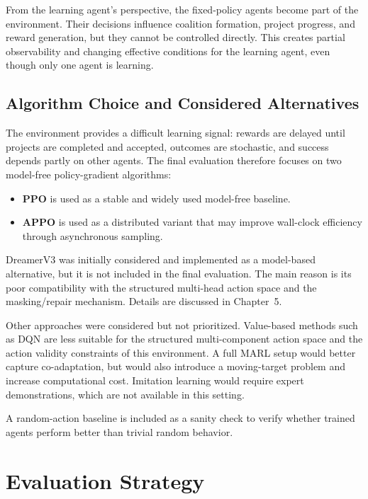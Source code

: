 \documentclass[english,bachelor]{hsluthesis}
\begin{document}
From the learning agent's perspective, the fixed-policy agents become part of the environment. Their decisions influence coalition formation, project progress, and reward generation, but they cannot be controlled directly. This creates partial observability and changing effective conditions for the learning agent, even though only one agent is learning.

\subsection{Algorithm Choice and Considered Alternatives}

The environment provides a difficult learning signal: rewards are delayed until projects are completed and accepted, outcomes are stochastic, and success depends partly on other agents. The final evaluation therefore focuses on two model-free policy-gradient algorithms:

\begin{itemize}
    \item \textbf{PPO} is used as a stable and widely used model-free baseline.
    \item \textbf{APPO} is used as a distributed variant that may improve wall-clock efficiency through asynchronous sampling.
\end{itemize}

DreamerV3 was initially considered and implemented as a model-based alternative, but it is not included in the final evaluation. The main reason is its poor compatibility with the structured multi-head action space and the masking/repair mechanism. Details are discussed in Chapter~5.

Other approaches were considered but not prioritized. Value-based methods such as DQN are less suitable for the structured multi-component action space and the action validity constraints of this environment. A full MARL setup would better capture co-adaptation, but would also introduce a moving-target problem and increase computational cost. Imitation learning would require expert demonstrations, which are not available in this setting.

A random-action baseline is included as a sanity check to verify whether trained agents perform better than trivial random behavior.

\section{Evaluation Strategy}
\end{document}
